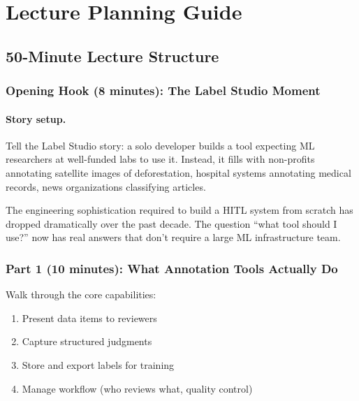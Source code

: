 \section{Lecture Planning Guide}

\subsection{50-Minute Lecture Structure}

\subsubsection{Opening Hook (8 minutes): The Label Studio Moment}

\paragraph{Story setup.}
Tell the Label Studio story: a solo developer builds a tool expecting ML researchers at well-funded labs to use it. Instead, it fills with non-profits annotating satellite images of deforestation, hospital systems annotating medical records, news organizations classifying articles.

\begin{keyconcept}
The engineering sophistication required to build a HITL system from scratch has dropped dramatically over the past decade. The question ``what tool should I use?'' now has real answers that don't require a large ML infrastructure team.
\end{keyconcept}

\subsubsection{Part 1 (10 minutes): What Annotation Tools Actually Do}

Walk through the core capabilities:
\begin{enumerate}
    \item Present data items to reviewers
    \item Capture structured judgments
    \item Store and export labels for training
    \item Manage workflow (who reviews what, quality control)
\end{enumerate}

